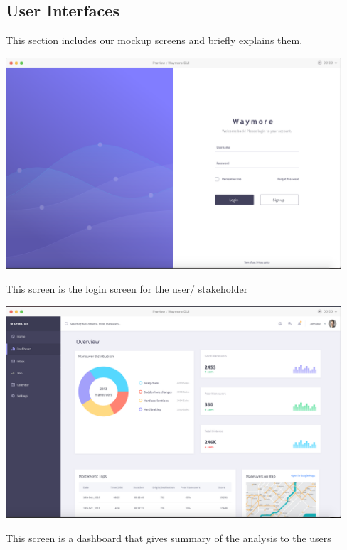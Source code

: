 \subsection{User Interfaces}

This section includes our mockup screens and briefly explains them.
\\

\begin{center}
    
\includegraphics[width = 125mm, scale = 1]{images/1.png}

This screen is the login screen for the user/ stakeholder

\includegraphics[width = 125mm, scale = 1]{images/2.png}

This screen is a dashboard that gives summary of the analysis to the users
\end{center}

